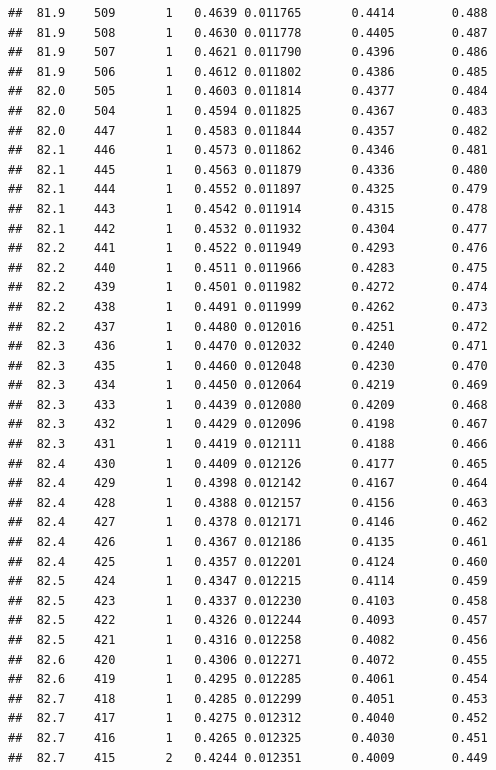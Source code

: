 \documentclass[
]{book}
\begin{document}
\begin{verbatim}
##  81.9    509       1   0.4639 0.011765       0.4414        0.488
##  81.9    508       1   0.4630 0.011778       0.4405        0.487
##  81.9    507       1   0.4621 0.011790       0.4396        0.486
##  81.9    506       1   0.4612 0.011802       0.4386        0.485
##  82.0    505       1   0.4603 0.011814       0.4377        0.484
##  82.0    504       1   0.4594 0.011825       0.4367        0.483
##  82.0    447       1   0.4583 0.011844       0.4357        0.482
##  82.1    446       1   0.4573 0.011862       0.4346        0.481
##  82.1    445       1   0.4563 0.011879       0.4336        0.480
##  82.1    444       1   0.4552 0.011897       0.4325        0.479
##  82.1    443       1   0.4542 0.011914       0.4315        0.478
##  82.1    442       1   0.4532 0.011932       0.4304        0.477
##  82.2    441       1   0.4522 0.011949       0.4293        0.476
##  82.2    440       1   0.4511 0.011966       0.4283        0.475
##  82.2    439       1   0.4501 0.011982       0.4272        0.474
##  82.2    438       1   0.4491 0.011999       0.4262        0.473
##  82.2    437       1   0.4480 0.012016       0.4251        0.472
##  82.3    436       1   0.4470 0.012032       0.4240        0.471
##  82.3    435       1   0.4460 0.012048       0.4230        0.470
##  82.3    434       1   0.4450 0.012064       0.4219        0.469
##  82.3    433       1   0.4439 0.012080       0.4209        0.468
##  82.3    432       1   0.4429 0.012096       0.4198        0.467
##  82.3    431       1   0.4419 0.012111       0.4188        0.466
##  82.4    430       1   0.4409 0.012126       0.4177        0.465
##  82.4    429       1   0.4398 0.012142       0.4167        0.464
##  82.4    428       1   0.4388 0.012157       0.4156        0.463
##  82.4    427       1   0.4378 0.012171       0.4146        0.462
##  82.4    426       1   0.4367 0.012186       0.4135        0.461
##  82.4    425       1   0.4357 0.012201       0.4124        0.460
##  82.5    424       1   0.4347 0.012215       0.4114        0.459
##  82.5    423       1   0.4337 0.012230       0.4103        0.458
##  82.5    422       1   0.4326 0.012244       0.4093        0.457
##  82.5    421       1   0.4316 0.012258       0.4082        0.456
##  82.6    420       1   0.4306 0.012271       0.4072        0.455
##  82.6    419       1   0.4295 0.012285       0.4061        0.454
##  82.7    418       1   0.4285 0.012299       0.4051        0.453
##  82.7    417       1   0.4275 0.012312       0.4040        0.452
##  82.7    416       1   0.4265 0.012325       0.4030        0.451
##  82.7    415       2   0.4244 0.012351       0.4009        0.449

\end{verbatim}
\end{document}
